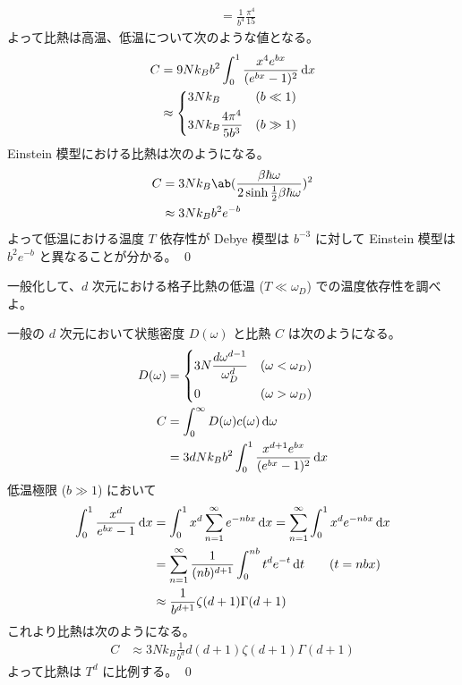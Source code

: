 \documentclass[uplatex,dvipdfmx,a4paper,11pt]{jlreq}
\makeatletter
\numberwithin{equation}{section}
\theoremstyle{definition}
\renewenvironment{proof}[1][\proofname]{\par
  \normalfont
  \topsep6\p@\@plus6\p@ \trivlist
  \item[\hskip\labelsep{\bfseries #1}\@addpunct{\bfseries}]\ignorespaces\quad\par
}{%
  \qed\endtrivlist\@endpefalse
}
\renewcommand\proofname{証明}
\makeatother
\begin{document}
\begin{proof}
\begin{align}
                                         & = \frac{1}{b^4}\frac{\pi^4}{15}
  \end{align}
  よって比熱は高温、低温について次のような値となる。
  \begin{align}
    C & = 9Nk_Bb^2\int_0^1\frac{x^4e^{bx}}{(e^{bx} - 1)^2}\dl{x} \\
      & \approx \begin{dcases}
                  3Nk_B                    & (b \ll 1) \\
                  3Nk_B\frac{4\pi^4}{5b^3} & (b \gg 1)
                \end{dcases}
  \end{align}
  Einstein 模型における比熱は次のようになる。
  \begin{align}
    C & = 3Nk_B\ab(\frac{\beta\hbar\omega}{2\sinh\frac{1}{2}\beta\hbar\omega})^2 \\
      & \approx 3Nk_Bb^2e^{-b}
  \end{align}
  よって低温における温度 $T$ 依存性が Debye 模型は $b^{-3}$ に対して Einstein 模型は $b^2e^{-b}$ と異なることが分かる。
\end{proof}

\begin{problem}
一般化して、$d$ 次元における格子比熱の低温 ($T \ll \omega_D$) での温度依存性を調べよ。
\end{problem}
\begin{proof}
  一般の $d$ 次元において状態密度 $D(\omega)$ と比熱 $C$ は次のようになる。
  \begin{align}
    D(\omega) & = \begin{dcases}
                    3N\frac{d\omega^{d-1}}{\omega_D^d} & (\omega < \omega_D) \\
                    0                                  & (\omega > \omega_D)
                  \end{dcases} \\
    C         & = \int_0^\infty D(\omega)c(\omega)\dl{\omega}                         \\
              & = 3dNk_Bb^2\int_0^1\frac{x^{d+1}e^{bx}}{(e^{bx} - 1)^2}\dl{x}         \\
  \end{align}
  低温極限 ($b \gg 1$) において
  \begin{align}
    \int_0^1\frac{x^{d}}{e^{bx} - 1}\dl{x} & = \int_0^1x^d\sum_{n=1}^{\infty}e^{-nbx}\dl{x} = \sum_{n=1}^{\infty}\int_0^1x^de^{-nbx}\dl{x} \\
                                           & = \sum_{n=1}^{\infty}\frac{1}{(nb)^{d+1}}\int_0^{nb}t^de^{-t}\dl{t} \qquad (t = nbx)          \\
                                           & \approx \frac{1}{b^{d+1}}\zeta(d+1)\Gamma(d+1)
  \end{align}
  これより比熱は次のようになる。
  \begin{align}
    C & \approx 3Nk_B\frac{1}{b^d}d(d+1)\zeta(d+1)\Gamma(d+1)
  \end{align}
  よって比熱は $T^d$ に比例する。
\end{proof}
\end{document}
